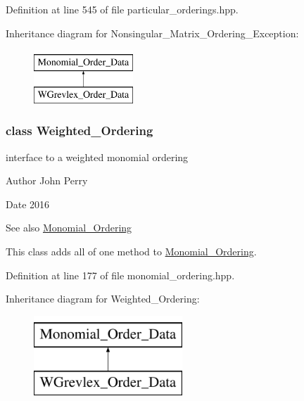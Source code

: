 Definition at line 545 of file particular\+\_\+orderings.\+hpp.

Inheritance diagram for Nonsingular\+\_\+\+Matrix\+\_\+\+Ordering\+\_\+\+Exception\+:\begin{figure}[H]
\begin{center}
\leavevmode
\includegraphics[height=2.000000cm]{group__orderinggroup}
\end{center}
\end{figure}
\label{class_weighted___ordering}
\subsubsection{class Weighted\+\_\+\+Ordering}
interface to a weighted monomial ordering 

\begin{DoxyAuthor}{Author}
John Perry 
\end{DoxyAuthor}
\begin{DoxyDate}{Date}
2016 
\end{DoxyDate}
\begin{DoxySeeAlso}{See also}
\hyperlink{group__orderinggroup_class_monomial___ordering}{Monomial\+\_\+\+Ordering}
\end{DoxySeeAlso}
This class adds all of one method to \hyperlink{group__orderinggroup_class_monomial___ordering}{Monomial\+\_\+\+Ordering}. 

Definition at line 177 of file monomial\+\_\+ordering.\+hpp.

Inheritance diagram for Weighted\+\_\+\+Ordering\+:\begin{figure}[H]
\begin{center}
\leavevmode
\includegraphics[height=3.000000cm]{group__orderinggroup}
\end{center}
\end{figure}
